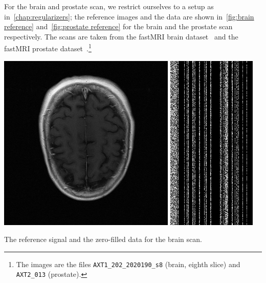 For the brain and prostate scan, we restrict ourselves to a setup as in~\cref{chap:regularizers};
the reference images and the data are shown in~\cref{fig:brain reference} and~\cref{fig:prostate reference} for the brain and the prostate scan respectively.
The scans are taken from the fastMRI brain dataset~\cite{9420272} and the fastMRI prostate dataset~\cite{tibrewala2024fastmri}.\footnote{%
	The images are the files \texttt{AXT1\_202\_2020190\_s8} (brain, eighth slice) and \texttt{AXT2\_013} (prostate).%
}
\begin{sidefigure}
	\centering
	\includegraphics[width=\marginparwidth]{scripts/ood/brain/reference-rss}
	\includegraphics[width=.5\marginparwidth]{scripts/ood/brain/log-abs-data}
	\caption[Reference signal and zero-filled data for the brain scan]{The reference signal and the zero-filled data for the brain scan.}%
	\label{fig:brain reference}
\end{sidefigure}
